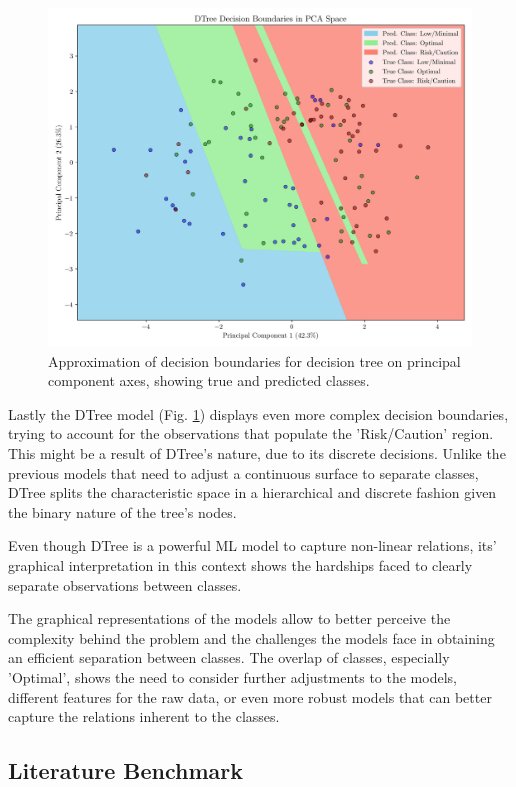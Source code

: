 \documentclass[conference]{IEEEtran}
\begin{document}
\begin{figure}[H]
    \centering
    \includegraphics[width=1\linewidth]{assets/pca_dtree.png}
    \caption{Approximation of decision boundaries for decision tree on principal component axes, showing true and predicted classes.}
    \label{pca_dtree}
\end{figure} %

Lastly the DTree model (Fig. \ref{pca_dtree}) displays even more complex decision boundaries, trying to account for the observations that populate the 'Risk/Caution' region. This might be a result of DTree's nature, due to its discrete decisions. Unlike the previous models that need to adjust a continuous surface to separate classes, DTree splits the characteristic space in a hierarchical and discrete fashion given the binary nature of the tree's nodes.

Even though DTree is a powerful ML model to capture non-linear relations, its' graphical interpretation in this context shows the hardships faced to clearly separate observations between classes.

The graphical representations of the models allow to better perceive the complexity behind the problem and the challenges the models face in obtaining an efficient separation between classes. The overlap of classes, especially 'Optimal', shows the need to consider further adjustments to the models, different features for the raw data, or even more robust models that can better capture the relations inherent to the classes.

\subsection{Literature Benchmark}
\end{document}
